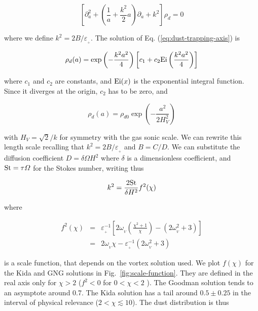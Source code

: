 \documentclass[apj]{emulateapj}
\newcommand{\Eq}[1]{Eq. (\ref{#1})}
\newcommand{\eq}[1]{\Eq{#1}}
\newcommand{\Fig}[1]{Fig.~\ref{#1}}
\newcommand{\fig}[1]{\Fig{#1}}
\newcommand{\beq}{\begin{equation}}
\newcommand{\eeq}{\end{equation}}
\newcommand{\beqn}{\begin{eqnarray}}
\newcommand{\eeqn}{\end{eqnarray}}
\newcommand{\epsp}{\varepsilon_{_{+}}}
\begin{document}
\beq\label{eq:dust-trapping-axis}
\left[\partial^2_a  +  \left(\frac{1}{a} +  \frac{k^2}{2}a\right) \partial_a  + k^2\right]\rho_d = 0 
\eeq

\noindent where we define $k^2=2B/\epsp$. The solution of
\eq{eq:dust-trapping-axis} is 

\beq
\rho_d(a) = \exp\left(-\frac{k^2a^2}{4}\right)  \left[c_1 + c_2 {\rm
    Ei}\left(\frac{k^2a^2}{4}\right)\right]
\eeq

\noindent where $c_1$ and $c_2$ are constants, and ${\rm Ei}(x)$ is the exponential integral function. 
Since it diverges at the origin, $c_2$ has to be zero, and 

\beq
\rho_d(a) = \rho_{d0} \exp\left(-\frac{a^2}{2H_V^2}\right)
\eeq

\noindent with $H_V = \sqrt{2}/k$ for symmetry with the gas sonic scale. We can 
rewrite this length scale recalling that $k^2=2B/\epsp$ and
$B=C/D$. We can substitute the diffusion coefficient $D=\delta \varOmega H^2$ where 
$\delta$ is a dimensionless coefficient, and ${\rm St} = \tau\varOmega$ for 
the Stokes number, writing thus 

\beqn
\label{eq:k}
k^2 = \frac{2{\rm St}}{\delta H^2} f^2(\chi)
\eeqn 

\noindent where 

\beqn
f^2(\chi) &=& \epsp^{-1} \left[2\omega_{_V}\left(\frac{\chi^2+1}{\chi}\right) - (2\omega_{_V}^2 + 3) \right]\nonumber \\
          &=& 2\omega_{_V}\chi - \epsp^{-1}(2\omega_{_V}^2 + 3)
\label{eq:scale-function}
\eeqn

\noindent is a scale function, that depends on the vortex solution
used. We plot $f(\chi)$ for the Kida and GNG solutions in
\fig{fig:scale-function}. They are defined in the real axis only for $\chi > 2$ ($f^2
< 0$ for $0 < \chi < 2$ ). The Goodman solution tends to an asymptote
around 0.7. The Kida solution has a  tail around $0.5\pm0.25$ in the
interval of physical relevance ($2 < \chi \lesssim 10$). The dust distribution is thus 
\end{document}
